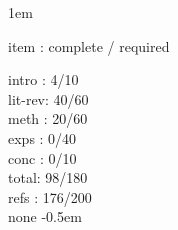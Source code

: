 \documentclass[12pt]{book}
\begin{document}
\raggedbottom
\setlength{\oddsidemargin}{53pt}
\setlength{\evensidemargin}{53pt}
\setlength{\marginparwidth}{57pt}
\setlength{\footskip}{30pt}
\openup 1em

\frontmatter
%

\tableofcontents
\listoffigures
\listoftables
\mainmatter
item : complete / required

intro : 4/10\\
lit-rev: 40/60\\
meth : 20/60\\
exps : 0/40\\
conc : 0/10\\

total: 98/180\\
refs : 176/200\\

\appendix
none
\backmatter
\openup -0.5em
%


\end{document}
